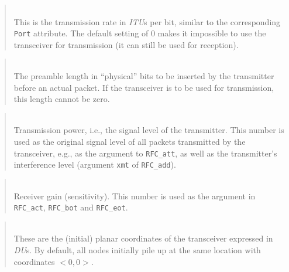 \begin{quote}
\noindent{}\\ \hspace{0in}
This is the transmission rate in {\em ITU\/}s per bit,
similar to the corresponding {\tt Port} attribute.
The default setting of 0 makes it impossible to use the transceiver
for transmission (it can still be used for reception).
\end{quote}

\begin{quote}
\noindent{}\\ \hspace{0in}
The preamble length in ``physical'' bits to be inserted by the transmitter
before an actual packet.
If the transceiver is to be used for transmission, this
length cannot be zero.
\end{quote}

\begin{quote}
\noindent{}\\ \hspace{0in}
Transmission power, i.e., the signal level of the transmitter.
This number is used as the original signal level of all packets transmitted
by the transceiver, e.g., as the argument to {\tt RFC\_att}, as well as the
transmitter's interference level (argument {\tt xmt} of {\tt RFC\_add}).
\end{quote}

\begin{quote}
\noindent{}\\ \hspace{0in}
Receiver gain (sensitivity).
This number is used as the argument
in {\tt RFC\_act}, {\tt RFC\_bot} and {\tt RFC\_eot}.
\end{quote}

\begin{quote}
\noindent{}\\ \hspace{0in}
These are the (initial) planar coordinates of the transceiver expressed
in {\em DU\/}s.
By default, all nodes initially pile up at the same location with
coordinates $<0,0>$.
\end{quote}

